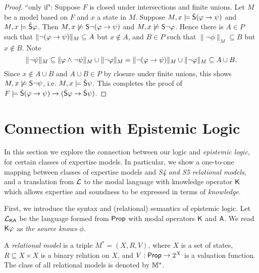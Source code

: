 \begin{proposition}
\begin{proof}
    ``only if": Suppose $F$ is closed under intersections and finite
    unions. Let $M$ be a model based on $F$ and $x$ a state
    in $M$. Suppose $M, x \models \hat\S(\phi \limplies \psi)$
    and $M, x \models \hat\S\phi$. Then $M, x \not\models
    \S\neg(\phi \limplies \psi)$ and $M, x \not\models \S\neg\phi$.
    Hence there is $A \in P$ such that $\|\neg(\phi \limplies
    \psi)\|_M \subseteq A$ but $x \notin A$, and $B \in P$ such
    that $\|\neg\phi\|_M \subseteq B$ but $x \notin B$. Note
    \[
        \|\neg\psi\|_M
        \subseteq \|\phi \land \neg\psi\|_M \cup \|\neg\phi\|_M
        = \|\neg(\phi \limplies \psi)\|_M \cup \|\neg\phi\|_M
        \subseteq A \cup B.
    \]
    Since $x \notin A \cup B$ and $A \cup B \in P$ by closure
    under finite unions, this shows $M, x \not\models \S\neg\psi$, i.e.
    $M, x \models \hat\S\psi$. This completes the proof of $F
    \models \hat{\S}(\phi \limplies \psi) \limplies (\hat{\S}\phi \limplies
    \hat{\S}\psi)$.

\end{proof}
\end{proposition}

\section{Connection with Epistemic Logic}
\label{sec_connection_with_ep_logic}

In this section we explore the connection between our logic and \emph{epistemic
logic}, for certain classes of expertise models. In particular, we show a
one-to-one mapping between classes of expertise models and \emph{S4 and S5
relational models}, and a translation from $\cL$ to the modal language with
knowledge operator $\K$ which allows expertise and soundness to be expressed in
terms of \emph{knowledge}.

First, we introduce the syntax and (relational) semantics of epistemic logic.
Let $\cLKA$ be the language formed from $\Prop$ with modal operators $\K$ and
$\A$. We read $\K\phi$ as \emph{the source knows} $\phi$.

\begin{definition}
\label{def_relational_models}

    A \emph{relational model} is a triple $M^* = (X, R, V)$, where $X$ is a set
    of states, $R \subseteq X \times X$ is a binary relation on $X$, and $V:
    \Prop \to 2^X$ is a valuation function. The class of all relational models
    is denoted by $\Mrel$.

\end{definition}

